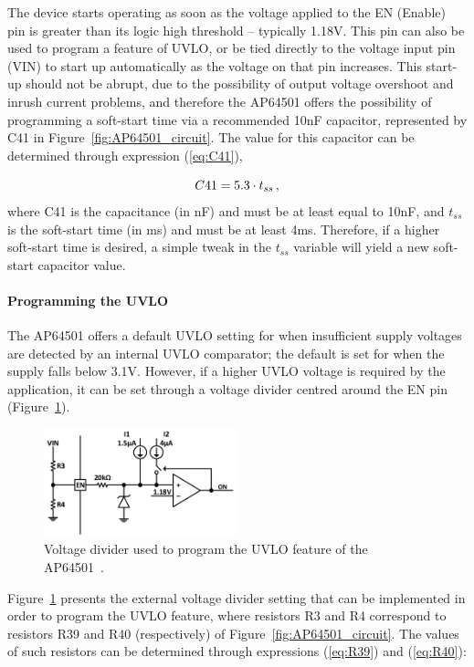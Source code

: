 The device starts operating as soon as the voltage applied to the EN (Enable) pin is greater than its logic high threshold -- typically 1.18V. This pin can also be used to program a feature of \gls{UVLO}, or be tied directly to the voltage input pin (VIN) to start up automatically as the voltage on that pin increases. This start-up should not be abrupt, due to the possibility of output voltage overshoot and inrush current problems, and therefore the AP64501 offers the possibility of programming a soft-start time via a recommended 10nF capacitor, represented by C41 in Figure~\ref{fig:AP64501_circuit}. The value for this capacitor can be determined through expression (\ref{eq:C41}),

\begin{equation}\label{eq:C41}
	C41 = 5.3 \cdot t_{ss}\,,\medskip
\end{equation}
where C41 is the capacitance (in nF) and must be at least equal to 10nF, and $t_{ss}$ is the soft-start time (in ms) and must be at least 4ms. Therefore, if a higher soft-start time is desired, a simple tweak in the $t_{ss}$ variable will yield a new soft-start capacitor value.

\paragraph{Programming the UVLO}	The AP64501 offers a default UVLO setting for when insufficient supply voltages are detected by an internal UVLO comparator; the default is set for when the supply falls below 3.1V. However, if a higher UVLO voltage is required by the application, it can be set through a voltage divider centred around the EN pin (Figure~\ref{fig:UVLO_divider}).

\begin{figure}[h]
	\centering
	\includegraphics[width=0.5\textwidth]{Chapters/Figures/chapter3/UVLO.png}
	\caption{Voltage divider used to program the UVLO feature of the AP64501~\cite{AP64501}.}
	\label{fig:UVLO_divider}
\end{figure}

Figure~\ref{fig:UVLO_divider} presents the external voltage divider setting that can be implemented in order to program the UVLO feature, where resistors R3 and R4 correspond to resistors R39 and R40 (respectively) of Figure~\ref{fig:AP64501_circuit}. The values of such resistors can be determined through expressions (\ref{eq:R39}) and (\ref{eq:R40}):

